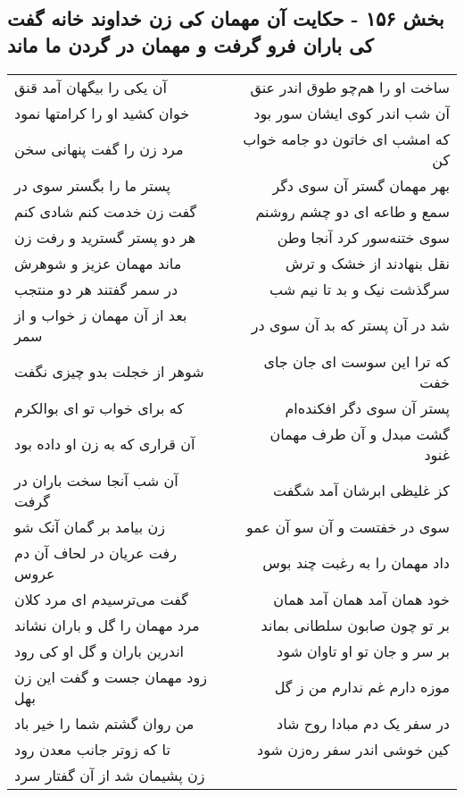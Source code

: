 \begin{center}
\section*{بخش ۱۵۶ - حکایت آن مهمان کی زن خداوند خانه گفت کی باران فرو گرفت و مهمان در گردن ما ماند}
\label{sec:sh156}
\begin{longtable}{l p{0.5cm} r}
آن یکی را بیگهان آمد قنق
&&
ساخت او را هم‌چو طوق اندر عنق
\\
خوان کشید او را کرامتها نمود
&&
آن شب اندر کوی ایشان سور بود
\\
مرد زن را گفت پنهانی سخن
&&
که امشب ای خاتون دو جامه خواب کن
\\
پستر ما را بگستر سوی در
&&
بهر مهمان گستر آن سوی دگر
\\
گفت زن خدمت کنم شادی کنم
&&
سمع و طاعه ای دو چشم روشنم
\\
هر دو پستر گسترید و رفت زن
&&
سوی ختنه‌سور کرد آنجا وطن
\\
ماند مهمان عزیز و شوهرش
&&
نقل بنهادند از خشک و ترش
\\
در سمر گفتند هر دو منتجب
&&
سرگذشت نیک و بد تا نیم شب
\\
بعد از آن مهمان ز خواب و از سمر
&&
شد در آن پستر که بد آن سوی در
\\
شوهر از خجلت بدو چیزی نگفت
&&
که ترا این سوست ای جان جای خفت
\\
که برای خواب تو ای بوالکرم
&&
پستر آن سوی دگر افکنده‌ام
\\
آن قراری که به زن او داده بود
&&
گشت مبدل و آن طرف مهمان غنود
\\
آن شب آنجا سخت باران در گرفت
&&
کز غلیظی ابرشان آمد شگفت
\\
زن بیامد بر گمان آنک شو
&&
سوی در خفتست و آن سو آن عمو
\\
رفت عریان در لحاف آن دم عروس
&&
داد مهمان را به رغبت چند بوس
\\
گفت می‌ترسیدم ای مرد کلان
&&
خود همان آمد همان آمد همان
\\
مرد مهمان را گل و باران نشاند
&&
بر تو چون صابون سلطانی بماند
\\
اندرین باران و گل او کی رود
&&
بر سر و جان تو او تاوان شود
\\
زود مهمان جست و گفت این زن بهل
&&
موزه دارم غم ندارم من ز گل
\\
من روان گشتم شما را خیر باد
&&
در سفر یک دم مبادا روح شاد
\\
تا که زوتر جانب معدن رود
&&
کین خوشی اندر سفر ره‌زن شود
\\
زن پشیمان شد از آن گفتار سرد

\end{longtable}
\end{center}
